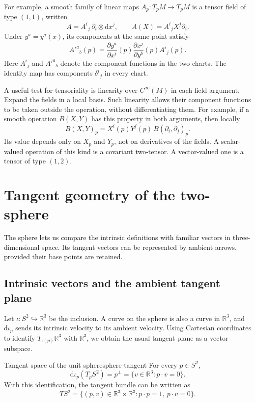 \documentclass[11pt,a4paper]{article}
\numberwithin{equation}{section}
\newcommand{\R}{\mathbb R}
\newcommand{\dd}{\mathrm d}
\newcommand{\Cinf}{C^\infty}
\newcommand{\slideref}[1]{\par\nobreak\smallskip\nobreak{\footnotesize\color{ink!60}\textsc{Source slide #1}}\par\nobreak\smallskip\nobreak}
\begin{document}
For example, a smooth family of linear maps \(A_p:T_pM\to T_pM\) is
a tensor field of type \((1,1)\), written
\[
 A=A^i{}_j\,\partial_i\otimes\dd x^j,
 \qquad A(X)=A^i{}_jX^j\partial_i.
\]
Under \(y^a=y^a(x)\), its components at the same point satisfy
\[
 A'^a{}_b(p)=
 \frac{\partial y^a}{\partial x^i}(p)
 \frac{\partial x^j}{\partial y^b}(p)A^i{}_j(p).
\]
Here \(A^i{}_j\) and \(A'^a{}_b\) denote the component functions in
the two charts. The identity map has components \(\delta^i{}_j\) in
every chart.

A useful test for tensoriality is linearity over \(\Cinf(M)\) in
each field argument. Expand the fields in a local basis. Such linearity
allows their component functions to be taken outside the operation,
without differentiating them. For example, if a smooth operation
\(B(X,Y)\) has this property in both arguments, then locally
\[
 B(X,Y)_p=X^i(p)Y^j(p)\,B(\partial_i,\partial_j)_p.
\]
Its value depends only on \(X_p\) and \(Y_p\), not on derivatives
of the fields. A scalar-valued operation of this kind is a covariant
two-tensor. A vector-valued one is a tensor of type \((1,2)\).

\section{Tangent geometry of the two-sphere}
\label{sec:sphere-tangent}
\slideref{12}

The sphere lets us compare the intrinsic definitions with familiar vectors
in three-dimensional space. Its tangent vectors can be represented by
ambient arrows, provided their base points are retained.

\subsection{Intrinsic vectors and the ambient tangent plane}

Let \(\iota:S^2\hookrightarrow\R^3\) be the inclusion. A curve on the
sphere is also a curve in \(\R^3\), and \(\dd\iota_p\) sends its
intrinsic velocity to its ambient velocity. Using Cartesian coordinates
to identify \(T_{\iota(p)}\R^3\) with \(\R^3\), we obtain the usual
tangent plane as a vector subspace.

\begin{proposition}{Tangent space of the unit sphere}{sphere-tangent}
For every \(p\in S^2\),
\[
 \dd\iota_p(T_pS^2)=p^\perp
 =\{v\in\R^3:p\cdot v=0\}.
\]
With this identification, the tangent bundle can be written as
\[
 TS^2=\{(p,v)\in\R^3\times\R^3:p\cdot p=1,\ p\cdot v=0\}.
\]
\end{proposition}
\end{document}
